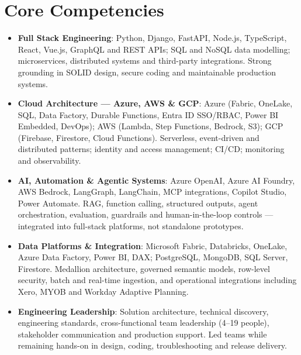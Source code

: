 \documentclass[11pt,a4paper,sans]{moderncv}
\begin{document}
\section{Core Competencies}
\vspace{1pt}
\begin{itemize}

\item \textbf{Full Stack Engineering}: Python, Django, FastAPI, Node.js, TypeScript, React, Vue.js, GraphQL and REST APIs; SQL and NoSQL data modelling; microservices, distributed systems and third-party integrations. Strong grounding in SOLID design, secure coding and maintainable production systems.

\item \textbf{Cloud Architecture — Azure, AWS \& GCP}: Azure (Fabric, OneLake, SQL, Data Factory, Durable Functions, Entra ID SSO/RBAC, Power BI Embedded, DevOps); AWS (Lambda, Step Functions, Bedrock, S3); GCP (Firebase, Firestore, Cloud Functions). Serverless, event-driven and distributed patterns; identity and access management; CI/CD; monitoring and observability.

\item \textbf{AI, Automation \& Agentic Systems}: Azure OpenAI, Azure AI Foundry, AWS Bedrock, LangGraph, LangChain, MCP integrations, Copilot Studio, Power Automate. RAG, function calling, structured outputs, agent orchestration, evaluation, guardrails and human-in-the-loop controls — integrated into full-stack platforms, not standalone prototypes.

\item \textbf{Data Platforms \& Integration}: Microsoft Fabric, Databricks, OneLake, Azure Data Factory, Power BI, DAX; PostgreSQL, MongoDB, SQL Server, Firestore. Medallion architecture, governed semantic models, row-level security, batch and real-time ingestion, and operational integrations including Xero, MYOB and Workday Adaptive Planning.

\item \textbf{Engineering Leadership}: Solution architecture, technical discovery, engineering standards, cross-functional team leadership (4–19 people), stakeholder communication and production support. Led teams while remaining hands-on in design, coding, troubleshooting and release delivery.

\end{itemize}

\end{document}
